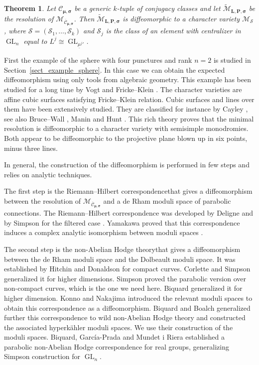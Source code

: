 \documentclass[11pt]{article}
\theoremstyle{definition}
\theoremstyle{plain}
\newtheorem{theorem}[definition]{Theorem}
\DeclareMathOperator{\GL}{GL}
\newcommand{\mcmus}{\mathcal{M}_{\overline{\mathcal{C}}_{\boldsymbol{\mu},\boldsymbol{\sigma}}}}
\newcommand{\mlps}{\widetilde{\mathcal{M}}_{\boldsymbol{L},\boldsymbol{P},\boldsymbol{\sigma}}}
\begin{document}
\begin{theorem}\label{th_diffeo_resol_ss}
Let $\mathcal{C}_{\boldsymbol{\mu},\boldsymbol{\sigma}}$ be a generic $k$-tuple of conjugacy classes and let $\mlps$ be the resolution of $\mcmus$. Then $\mlps$ is diffeomorphic to a character variety $\mathcal{M}_{\boldsymbol{\mathcal{S}}}$, where $\boldsymbol{\mathcal{S}}=\left(\mathcal{S}_1,\dots,\mathcal{S}_k\right)$ and $\mathcal{S}_j$ is the class of an element with centralizer in $\GL_n$ equal to $L^j\cong \GL_{{\underline{\mu}^j}'}$.
\end{theorem}

First the example of the sphere with four punctures and rank $n=2$ is studied in Section~\ref{sect_example_sphere}. In this case we can obtain the expected diffeomorphism using only tools from algebraic geometry. This example has been studied for a long time by Vogt \cite{Vogt} and Fricke--Klein \cite{Fricke_Klein}. The character varieties are affine cubic surfaces satisfying Fricke--Klein relation. Cubic surfaces and lines over them have been extensively studied. They are classified for instance by Cayley \cite{Cayley}, see also Bruce--Wall \cite{Bruce_cubic}, Manin \cite{Manin1986} and Hunt \cite{Hunt}. This rich theory proves that the minimal resolution is diffeomorphic to a character variety with semisimple monodromies. Both appear to be diffeomorphic to the projective plane blown up in six points, minus three lines.

In general, the construction of the diffeomorphism is performed in few steps and relies on analytic techniques.

The first step is the Riemann--Hilbert correspondencethat gives a diffeomorphism between the resolution of $\mathcal{M}_{\overline{{\mathcal{C}}}_{\boldsymbol{\mu},\boldsymbol{\sigma}}}$ and a de Rham moduli space of parabolic connections. The Riemann--Hilbert correspondence was developed by Deligne \cite{Deligne_equadif_rh} and by Simpson for the filtered case \cite{Simpson}. Yamakawa proved that this correspondence induces a complex analytic isomorphism between moduli spaces \cite{Yamakawa}.

The second step is the non-Abelian Hodge theorythat gives a diffeomorphism between the de Rham moduli space and the Dolbeault moduli space. It was established by Hitchin \cite{Hitchin87} and Donaldson \cite{Donaldson} for compact curves. Corlette \cite{Corlette} and Simpson \cite{Simpson_88} generalized it for higher dimensions. Simpson \cite{Simpson} proved the parabolic version over non-compact curves, which is the one we need here. Biquard \cite{Biquard97} generalized it for higher dimension. Konno \cite{Konno} and Nakajima \cite{Nakajima_1996} introduced the relevant moduli spaces to obtain this correspondence as a diffeomorphism. Biquard and Boalch \cite{Biquard_Boalch_2004} generalized further this correspondence to wild non-Abelian Hodge theory and constructed the associated hyperkähler moduli spaces. We use their construction of the moduli spaces. Biquard, García-Prada and Mundet i Riera \cite{Biquard_Garcia_Prada_Riera} established a parabolic non-Abelian Hodge correspondence for real groups, generalizing Simpson construction for $\GL_n$.
\end{document}
